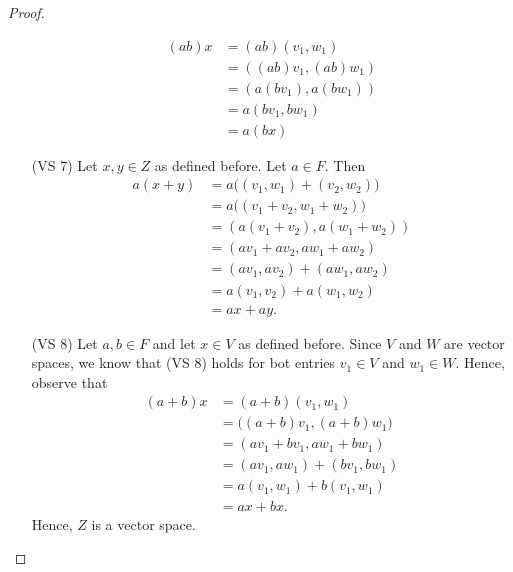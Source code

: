 \begin{proof}
\begin{enumerate}
\begin{align*}
            (ab)x &= (ab)(v_{1}, w_{1})  \\ 
                  &= ( (ab) v_{1} , (ab) w_{1} ) \\
                  &= ( a(b v_{1}) , a(bw_{1})) \tag{\( V,W  \) vector space} \\
                  &= a (bv_{1}, bw_{1}) \\
                  &= a (bx)
        \end{align*}
    \item[(VS 7)] Let \( x,y \in Z  \) as defined before. Let \( a \in F  \). Then 
        \begin{align*}
           a(x+y)  &= a \Big(  (v_{1}, w_{1})  + (v_{2}, w_{2}) \Big)  \\
                   &= a \Big(  (v_{1} + v_{2}, w_{1} + w_{2}) \Big) \\
                   &= (a(v_{1} + v_{2}), a(w_{1} + w_{2})) \\
                   &= (av_{1} + av_{2}, aw_{1} + aw_{2}) \\
                   &= (av_{1}, av_{2}) + (aw_{1}, aw_{2}) \\
                   &= a(v_{1}, v_{2}) + a(w_{1}, w_{2}) \\
                   &= a x + ay.
        \end{align*}
    \item[(VS 8)] Let \( a,b \in F  \) and let \( x \in V  \) as defined before. Since \( V  \) and \( W  \) are vector spaces, we know that (VS 8) holds for bot entries \( v_{1} \in V  \) and \( w_{1} \in W  \). Hence, observe that 
        \begin{align*}
            (a+b) x  &= (a+b) (v_{1} , w_{1} ) \\
                     &= \Big( (a+b) v_{1} , (a+b) w_{1} \Big)  \\
                     &=  ( av_{1} + bv_{1} , aw_{1} + bw_{1}) \\
                     &=  ( av_{1}, aw_{1} ) + (bv_{1} , bw_{1}) \\
                     &= a(v_{1}, w_{1}) + b(v_{1}, w_{1}) \\
                     &= ax + bx.
        \end{align*}
    Hence, \( Z  \) is a vector space.
\end{enumerate}

\end{proof}



